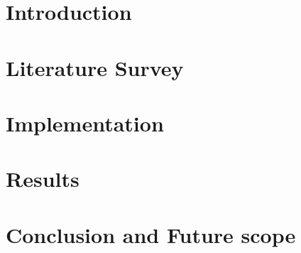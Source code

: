 \documentclass[a4paper, 12pt, oneside, BCOR1cm,toc=chapterentrywithdots]{scrbook}
\begin{document}
\chapter{Introduction}

\chapter{Literature Survey}


\chapter{Implementation}


\chapter{Results}


\chapter{Conclusion and Future scope}







\end{document}

